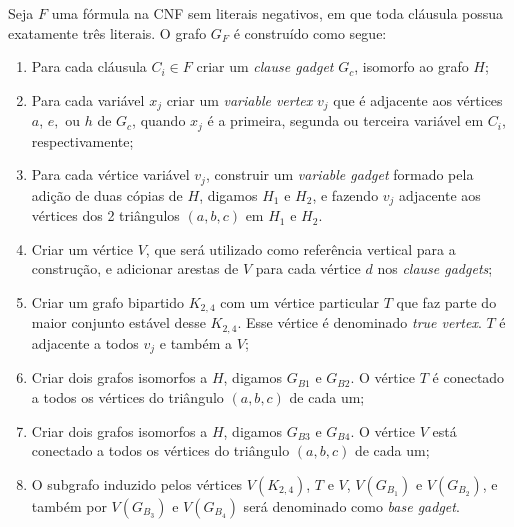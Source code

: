 \begin{definition}\label{sec:reducao}
Seja $F$ uma fórmula na CNF sem literais negativos, em que toda cláusula possua exatamente três literais. O grafo $G_F$ é construído como segue:

\begin{enumerate}
\item Para cada cláusula $C_i \in F$ criar um \textit{clause gadget} $G_{c}$, isomorfo ao grafo $H$;

\item Para cada variável $x_{j}$ criar um \emph{variable vertex} $v_{j}$ que é adjacente aos vértices $a$, $e,$ ou $h$ de $G_c$, quando $x_{j}$ é a primeira, segunda ou terceira variável em $C_i$, respectivamente;

\item Para cada vértice variável $v_{j}$, construir um \emph{variable gadget} formado pela adição de duas cópias de  $H$, digamos $H_1$ e $H_2$, e fazendo $v_j$ adjacente aos vértices dos 2 triângulos $(a, b, c)$ em  $H_1$ e $H_2$.



\item Criar um vértice $V$, que será utilizado como referência vertical para a construção, e adicionar arestas de  $V$ para cada vértice  $d$ nos \emph{clause gadgets};%

\item Criar um grafo bipartido $K_{2,4}$ com um vértice particular $T$ que faz parte do maior conjunto estável desse $K_{2,4}$. Esse vértice é denominado \emph{true vertex}. $T$ é adjacente a todos  $v_{j}$ e também a $V$;

\item Criar dois grafos isomorfos a $H$, digamos $G_{B1}$ e $G_{B2}$. O vértice $T$ é conectado a todos os vértices do triângulo $(a,b,c)$
de cada um;


\item Criar dois grafos isomorfos a $H$, digamos $G_{B3}$ e $G_{B4}$. O vértice $V$ está conectado a todos os vértices do triângulo $(a,b,c)$ de cada um;

\item O subgrafo induzido pelos vértices $V(K_{2,4})$, $T$ e $V$,  $V(G_{B_1})$ e $V(G_{B_2})$, e também por $V(G_{B_3})$ e $V(G_{B_4})$ será denominado como \emph{base gadget}. 
\end{enumerate}
\end{definition}


